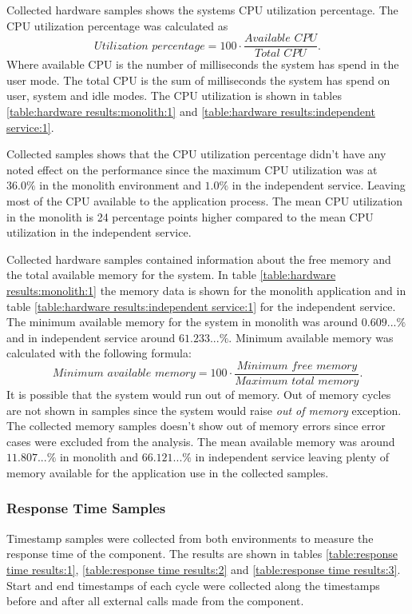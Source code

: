 Collected hardware samples shows the systems CPU utilization percentage.
The CPU utilization percentage was calculated as
\[
\textit{Utilization percentage} = 100 \cdot \frac{\textit{Available CPU}}{\textit{Total CPU}}
.\]
Where available CPU is the number of milliseconds the system has spend in the user mode.
The total CPU is the sum of milliseconds the system has spend on user, system and idle modes. The CPU utilization is shown in tables \ref{table:hardware results:monolith:1} and \ref{table:hardware results:independent service:1}.

Collected samples shows that the CPU utilization percentage didn't have any noted effect on the performance since the maximum CPU utilization was at $36.0\%$ in the monolith environment and $1.0\%$ in the independent service.
Leaving most of the CPU available to the application process.
The mean CPU utilization in the monolith is 24 percentage points higher compared to the mean CPU utilization in the independent service.

Collected hardware samples contained information about the free memory and the total available memory for the system.
In table \ref{table:hardware results:monolith:1} the memory data is shown for the monolith application and in table \ref{table:hardware results:independent service:1} for the independent service.
The minimum available memory for the system in monolith was around $0.609...\%$ and in independent service around $61.233...\%$.
Minimum available memory was calculated with the following formula:
\[
\textit{Minimum available memory} = 100 \cdot \frac{\textit{Minimum free memory}}{\textit{Maximum total memory}}
.\]
It is possible that the system would run out of memory.
Out of memory cycles are not shown in samples since the system would raise \textit{out of memory} exception.
The collected memory samples doesn't show out of memory errors since error cases were excluded from the analysis.
The mean available memory was around $11.807...\%$ in monolith and $66.121...\%$ in independent service leaving plenty of memory available for the application use in the collected samples.

\subsubsection{Response Time Samples}
Timestamp samples were collected from both environments to measure the response time of the component.
The results are shown in tables \ref{table:response time results:1}, \ref{table:response time results:2} and \ref{table:response time results:3}.
Start and end timestamps of each cycle were collected along the timestamps before and after all external calls made from the component.

